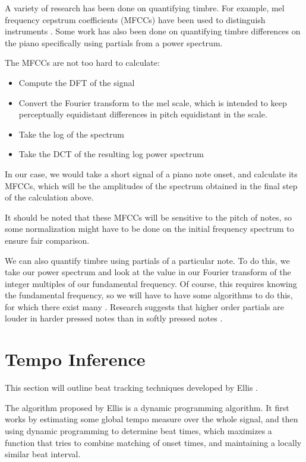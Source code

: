 \documentclass[12pt]{article}
\begin{document}
A variety of research has been done on quantifying timbre. For example, mel frequency cepstrum coefficients (MFCCs) have been used to distinguish instruments \cite{mfcc}. Some work has also been done on quantifying timbre differences on the piano specifically \cite{pianotimbre} using partials from a power spectrum.

The MFCCs are not too hard to calculate:

\begin{itemize}
    \item
        Compute the DFT of the signal
       
    \item
        Convert the Fourier transform to the mel scale, which is intended to keep perceptually equidistant differences in pitch equidistant in the scale.

    \item
        Take the log of the spectrum

    \item
        Take the DCT of the resulting log power spectrum
\end{itemize}

In our case, we would take a short signal of a piano note onset, and calculate its MFCCs, which will be the amplitudes of the spectrum obtained in the final step of the calculation above.

It should be noted that these MFCCs will be sensitive to the pitch of notes, so some normalization might have to be done on the initial frequency spectrum to ensure fair comparison.

We can also quantify timbre using partials of a particular note. To do this, we take our power spectrum and look at the value in our Fourier transform of the integer multiples of our fundamental frequency. Of course, this requires knowing the fundamental frequency, so we will have to have some algorithms to do this, for which there exist many \cite{pitchdetectionreview}. Research suggests that higher order partials are louder in harder pressed notes than in softly pressed notes \cite{pianotimbre}.


\section{Tempo Inference}

This section will outline beat tracking techniques developed by Ellis \cite{tempoinference}.

The algorithm proposed by Ellis is a dynamic programming algorithm. It first works by estimating some global tempo measure over the whole signal, and then using dynamic programming to determine beat times, which maximizes a function that tries to combine matching of onset times, and maintaining a locally similar beat interval.
\end{document}
